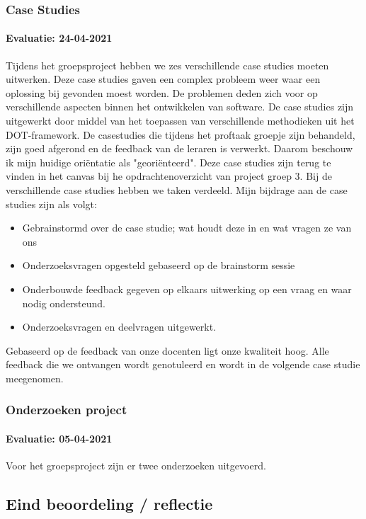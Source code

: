 \subsubsection{Case Studies}
\paragraph{Evaluatie: 24-04-2021}
Tijdens het groepsproject hebben we zes verschillende case studies moeten uitwerken.
Deze case studies gaven een complex probleem weer waar een oplossing bij gevonden moest worden.
De problemen deden zich voor op verschillende aspecten binnen het ontwikkelen van software.
De case studies zijn uitgewerkt door middel van het toepassen van verschillende methodieken uit het DOT-framework.
De casestudies die tijdens het proftaak groepje zijn behandeld, zijn goed afgerond en de feedback van de leraren is
verwerkt.
Daarom beschouw ik mijn huidige oriëntatie als "georiënteerd".
Deze case studies zijn terug te vinden in het canvas bij he opdrachtenoverzicht van project groep 3.
Bij de verschillende case studies hebben we taken verdeeld. Mijn bijdrage aan de case studies zijn als volgt:

\begin{itemize}
	\setlength{\itemsep}{0pt}%
	\setlength{\parskip}{0pt}%
	\item Gebrainstormd over de case studie; wat houdt deze in en wat vragen ze van ons
	\item Onderzoeksvragen opgesteld gebaseerd op de brainstorm sessie
	\item Onderbouwde feedback gegeven op elkaars uitwerking op een vraag en waar nodig ondersteund.
	\item Onderzoeksvragen en deelvragen uitgewerkt.

\end{itemize}

Gebaseerd op de feedback van onze docenten ligt onze kwaliteit hoog.
Alle feedback die we ontvangen wordt genotuleerd en wordt in de volgende case studie meegenomen.

\subsubsection{Onderzoeken project}
\paragraph{Evaluatie: 05-04-2021}
Voor het groepsproject zijn er twee onderzoeken uitgevoerd.

\subsection{Eind beoordeling / reflectie}
\newpage

